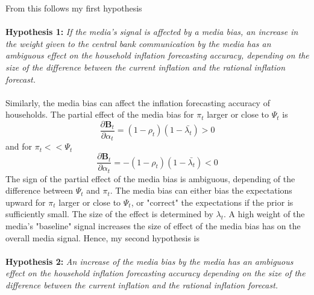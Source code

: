 \documentclass[review]{elsarticle}
\begin{document}
From this follows my first hypothesis
\\
\\
\textbf{Hypothesis 1:} \textit{If the media's signal is affected by a media bias, an increase in the weight given to the central bank communication by the media has an ambiguous effect on the household inflation forecasting accuracy, depending on the size of the difference between the current inflation and the rational inflation forecast.} 
\\
\\
Similarly, the media bias can affect the inflation forecasting accuracy of households. The partial effect of the media bias for $\pi_t$ larger or close to $\Psi_t$ is
\begin{equation}
\frac{\partial \mathbf{B}_t}{\partial \alpha_t} = (1-\rho_t) (1-\bar{\lambda_t}) > 0 
\end{equation}
and for $\pi_t << \Psi_t$
\begin{equation}
\frac{\partial \mathbf{B}_t}{\partial \alpha_t} = -(1-\rho_t) (1-\bar{\lambda_t}) < 0 
\end{equation}
The sign of the partial effect of the media bias is ambiguous, depending of the difference between $\Psi_t$ and $\pi_t$. The media bias can either bias the expectations upward for $\pi_t$ larger or close to $\Psi_t$, or "correct" the expectations if the prior is sufficiently small. The size of the effect is determined by $\lambda_t$.  A high weight of the media's "baseline" signal increases the size of effect of the media bias has on the overall media signal. 
Hence, my second hypothesis is
\\
\\
\textbf{Hypothesis 2:} \textit{An increase of the media bias by the media has an ambiguous effect on the household inflation forecasting accuracy depending on the size of the difference between the current inflation and the rational inflation forecast.}
\end{document}
